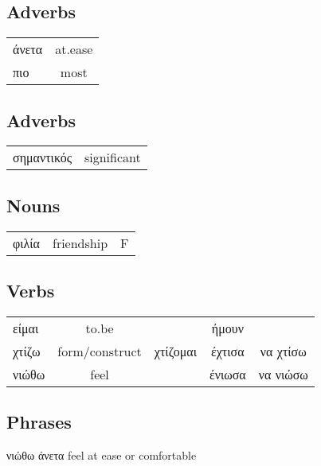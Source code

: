\documentclass[extrafontsizes,17pt]{memoir}
\begin{document}
\subsection{Adverbs}

\begin{tabular}{ l | c}
άνετα & at.ease \\
πιο & most \\
\end{tabular}


\subsection{Adverbs}

\begin{tabular}{ l | c}
σημαντικός & significant \\ 
\end{tabular}


\subsection{Nouns}

\begin{tabular}{ l | c | c }
φιλία & friendship & F
\end{tabular}

\subsection{Verbs}

\begin{tabular}{ l | c | c | c | c }
είμαι & to.be & & ήμουν & \\
χτίζω & form/construct & χτίζομαι & έχτισα & να χτίσω \\ 
νιώθω & feel & & ένιωσα & να νιώσω
\end{tabular}

\subsection{Phrases}

νιώθω άνετα feel at ease or comfortable
\end{document}
